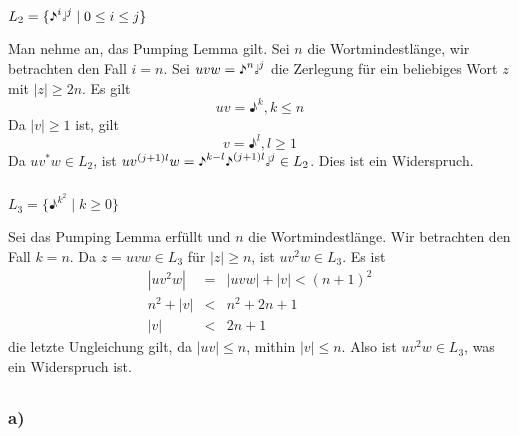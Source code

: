 \documentclass{article}
\begin{document}
   \subsubsection{}
   
   \begin{center}
      $L_2 = \{\eighthnote^i\halfnote^j \mid 0 \le i \le j\}$
   \end{center}

   Man nehme an, das Pumping Lemma gilt. Sei $n$ die Wortmindestl\"ange, wir
   betrachten den Fall $i = n$. Sei $uvw = \eighthnote^n\halfnote^j$ die
   Zerlegung f\"ur ein beliebiges Wort $z$ mit $|z|\ge 2n$. Es gilt
   \begin{equation*}
      uv = \eighthnote^k, k \le n
   \end{equation*}
   Da $|v| \ge 1$ ist, gilt
   \begin{equation*}
      v = \eighthnote^l, l \ge 1
   \end{equation*}
   Da $uv^*w \in L_2$, ist $uv^{(j+1)l}w =
   \eighthnote^{k-l}\eighthnote^{(j+1)l}\halfnote^j\in L_2$. Dies ist ein
   Widerspruch.

   \subsubsection{}

      \begin{center}
         $L_3 = \{\eighthnote^{k^2} \mid k \ge 0\}$
      \end{center}
      
      Sei das Pumping Lemma erf\"ullt und $n$ die Wortmindestl\"ange. Wir
      betrachten den Fall $k = n$. Da $z =
      uvw \in L_3$ f\"ur $|z| \ge n$, ist $uv^2w \in L_3$. Es ist
      \begin{eqnarray*}
         |uv^2w| & = & |uvw| + |v| < (n+1)^2 \\
         n^2 + |v| & < & n^2 +2n + 1 \\
         |v| & < & 2n+1
      \end{eqnarray*}
      die letzte Ungleichung gilt, da $|uv| \le n$, mithin $|v| \le n$. Also ist
      $uv^2w \in L_3$, was ein Widerspruch ist.
      
      \subsection{} 

      \subsubsection{a)}
      
\end{document}
